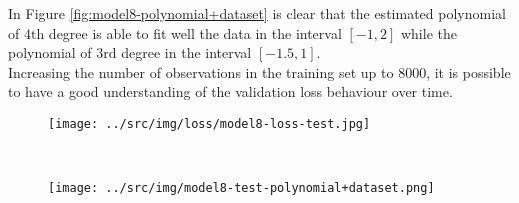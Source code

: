 \documentclass[a4paper,12pt]{article} %
\begin{document}
	In Figure \ref*{fig:model8-polynomial+dataset} is clear that the estimated 
	polynomial of $4\mathrm{th}$ degree is able to fit well the data in 
	the interval $[-1,2]$ while the polynomial of $3\mathrm{rd}$ degree 
	in the interval $[-1.5,1]$.\\
	
	Increasing the number of observations in the training set up to $8000$, it 
	is possible to have a good understanding of the validation loss behaviour 
	over time. 
	
	\begin{figure}[H]
		\begin{minipage}[t]{.5\textwidth}
			\centering
			\texttt{[image: ../src/img/loss/model8-loss-test.jpg]}
			\label{fig:model8-loss-test}
		\end{minipage}
		~
		\begin{minipage}[t]{.5\textwidth}
			\centering
			\texttt{[image: ../src/img/model8-test-polynomial+dataset.png]}
			\label{fig:model8-test-polynomial+dataset}
		\end{minipage}
	\end{figure}
\end{document}
